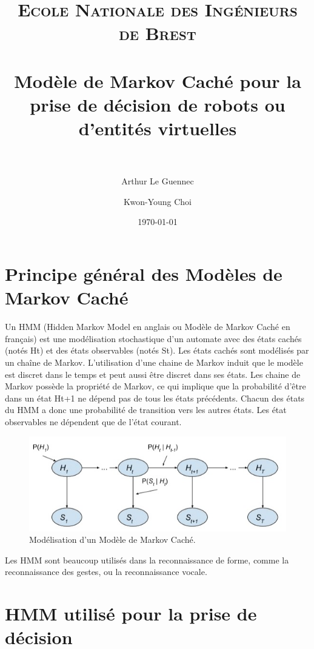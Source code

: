 \documentclass[paper=a4, fontsize=11pt]{scrartcl} %
\title{}
\title{	
\normalfont \normalsize 
\textsc{Ecole Nationale des Ingénieurs de Brest} \\ [25pt] %
\horrule{0.5pt} \\[0.4cm] %
\huge Modèle de Markov Caché pour la prise de décision de robots ou d'entités virtuelles \\ %
\horrule{2pt} \\[0.5cm] %
}
\author{Arthur Le Guennec \and Kwon-Young Choi}
\date{\normalsize\today} %
\numberwithin{equation}{section} %
\numberwithin{figure}{section} %
\numberwithin{table}{section} %
\begin{document}
\maketitle %


\section{Principe général des Modèles de Markov Caché}

Un HMM (Hidden Markov Model en anglais ou Modèle de Markov Caché en français) est une modélisation stochastique d'un automate avec des états cachés (notés Ht) et des états observables (notés St).
Les états cachés sont modélisés par un chaîne de Markov.
L'utilisation d'une chaine de Markov induit que le modèle est discret dans le temps et peut aussi être discret dans ses états.
Les chaine de Markov possède la propriété de Markov, ce qui implique que la probabilité d'être dans un état Ht+1 ne dépend pas de tous les états précédents.
Chacun des états du HMM a donc une probabilité de transition vers les autres états.
Les état observables ne dépendent que de l'état courant.

\begin{figure}[bp]
  \centering
  \includegraphics[scale=0.9]{hmm}
  \caption{\label{hmm} Modélisation d'un Modèle de Markov Caché.}
\end{figure}

Les HMM sont beaucoup utilisés dans  la reconnaissance de forme, comme la reconnaissance des gestes, ou la reconnaissance vocale.

\section{HMM utilisé pour la prise de décision}
\end{document}
